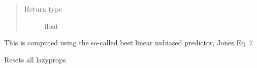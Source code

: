 \documentclass[letterpaper,10pt,english]{sphinxmanual}
\begin{document}
\begin{fulllineitems}
\begin{fulllineitems}
\begin{quote}
\begin{description}
\item[{Return type}] \leavevmode
float

\end{description}\end{quote}

This is computed using the so-called best linear unbiased predictor,  Jones Eq. 7

\end{fulllineitems}


\begin{fulllineitems}
\label{index:smbo.models.dace.reset}
Resets all lazyprops

\end{fulllineitems}


\end{fulllineitems}

\label{index:module-smbo.samplers}\label{index:module-samplers}
\end{document}
